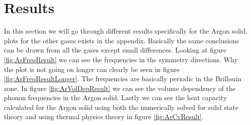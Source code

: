 \documentclass[11pt]{article}
\newlength\figureheight
\newlength\figurewidth
\newif\iftikz
\begin{document}
\section{Results}
In this section we will go through different results specifically for the Argon solid, plots for the other gases exists in the appendix. Basically the same conclusions can be drawn from all the gases except small differences. Looking at figure \ref{fig:ArFreqResult} we can see the frequencies in the symmetry directions. Why the plot is not going on longer can clearly be seen in figure \ref{fig:ArFreqResultLonger}. The frequencies are basically periodic in the Brillouin zone. In figure \ref{fig:ArVolDepResult} we can see the volume dependency of the phonon frequencies in the Argon solid. Lastly we can see the heat capacity calculated for the Argon solid using both the numerically solved for solid state theory and using thermal physics theory in figure \ref{fig:ArCvResult}.
\iftikz
\begin{figure}[H]
	\centering
	\setlength\figureheight{4cm} 
	\setlength\figurewidth{15cm}
	
	\caption{Here we can see the phonon frequencies in the Argon solid from the middle of the first Brillouin zone to the middle of the second. All frequency directions has been plotted (x,y and z) in each window. Due to sorting ascending frequency value we do not have the same color of all directions in the [110] direction.}
	\label{fig:ArFreqResult}
\end{figure}
\fi

\iftikz
\begin{figure}[H]
	\centering
	\setlength\figureheight{6cm} 
	\setlength\figurewidth{12cm}
	
	\caption{This picture highlights the periodicity of the frequency. The red vertical lines shows the boundary of the Brillouin zone and the cyan colored line shows the middle of the second Brillouin zone.}
	\label{fig:ArFreqResultLonger}
\end{figure}
\fi

\iftikz
\begin{figure}[H]
	\centering
	\setlength\figureheight{4cm} 
	\setlength\figurewidth{15cm}
	
	\caption{We can see the volume dependency of the phonon frequencies in the different symmetry directions. Here we can also see all the frequency directions. }
	\label{fig:ArVolDepResult}
\end{figure}
\fi

\iftikz
\begin{figure}[H]
	\centering
	\setlength\figureheight{5cm} 
	\setlength\figurewidth{12cm}
	
	\caption{Here we can see the two models for the heat capacity approaching each other in the high temperature limits.}
	\label{fig:ArCvResult}
\end{figure}
\fi
\end{document}
